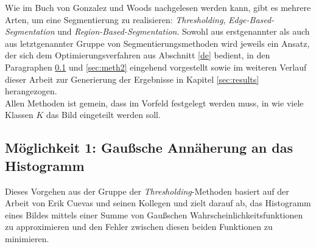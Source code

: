		Wie im Buch \cite[Kapitel 10]{gonzalez-woods} von Gonzalez und Woods nachgelesen werden kann, gibt es mehrere Arten, um eine Segmentierung zu realisieren: \textit{Thresholding}, \textit{Edge-Based-Segmentation} und \textit{Region-Based-Segmentation}. Sowohl aus erstgenannter als auch aus letztgenannter Gruppe von Segmentierungsmethoden wird jeweils ein Ansatz, der sich dem Optimierungsverfahren aus Abschnitt \ref{de} bedient, in den Paragraphen \ref{sec:meth1} und \ref{sec:meth2} eingehend vorgestellt sowie im weiteren Verlauf dieser Arbeit zur Generierung der Ergebnisse in Kapitel \ref{sec:results} herangezogen. \\
		Allen Methoden ist gemein, dass im Vorfeld festgelegt werden muss, in wie viele Klassen $K$ das Bild eingeteilt werden soll. 
		
	\subsection{Möglichkeit 1: Gaußsche Annäherung an das Histogramm}
	\label{sec:meth1}
		
		Dieses Vorgehen aus der Gruppe der \textit{Thresholding}-Methoden basiert auf der Arbeit von Erik Cuevas und seinen Kollegen \cite{cuevas-meth1} und zielt darauf ab, das Histogramm eines Bildes mittels einer Summe von Gaußschen Wahrscheinlichkeitsfunktionen zu approximieren und den Fehler zwischen diesen beiden Funktionen zu minimieren.
		

